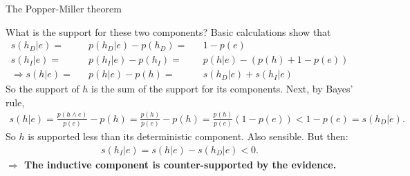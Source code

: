 \documentclass[8pt]{beamer}\usepackage[]{graphicx}\usepackage[]{color}
\begin{document}
\begin{frame}{The Popper-Miller theorem}

\pmminipage{}

What is the support for these two components?  Basic calculations show that
%
\begin{align*}
%
s(h_D | e)
    ={}&& p(h_D | e) - p(h_D)
    ={}&& 1 - p(e) \\
s(h_I | e)
    ={}&& p(h_I | e) - p(h_I)
    ={}&& p(h | e) - (p(h) + 1 - p(e))\\
%
\Rightarrow
s(h | e)
    ={}&& p(h | e) - p(h)
    ={}&&
    s(h_D | e) + s(h_I | e)
\end{align*}
%
So the support of $h$ is the sum of the support for its
components.  \pause Next, by Bayes' rule,
%
\begin{align*}
%
s(h | e)
    ={} \frac{p(h \land e)}{p(e)} - p(h)
    ={} \frac{p(h)}{p(e)} - p(h)
    ={} \frac{p(h)}{p(e)}\left(1 - p(e) \right)
    <{} 1 - p(e)
    ={} s(h_D | e).
%
\end{align*}
%
So $h$ is supported less than its deterministic component.  Also sensible.
\pause
But then:
%
\begin{align*}
%
s(h_I | e) = s(h | e) - s(h_D | e) < 0.
%
\end{align*}
%
\textbf{$\Rightarrow$ The inductive component is counter-supported by the evidence.}
%
\end{frame}


\end{document}

